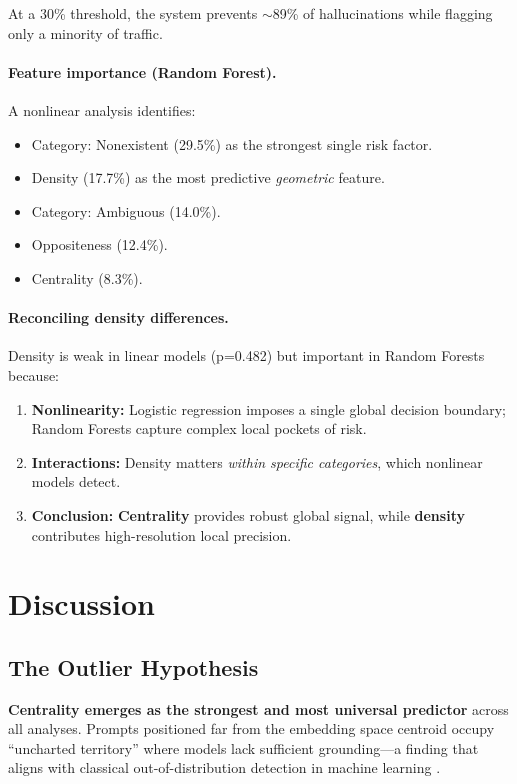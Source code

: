 \documentclass{article}
\begin{document}
At a 30\% threshold, the system prevents $\sim$89\% of hallucinations while flagging only a minority of traffic.

\paragraph{Feature importance (Random Forest).} A nonlinear analysis identifies:
\begin{itemize}
    \item Category: Nonexistent (29.5\%) as the strongest single risk factor.
    \item Density (17.7\%) as the most predictive \emph{geometric} feature.
    \item Category: Ambiguous (14.0\%).
    \item Oppositeness (12.4\%).
    \item Centrality (8.3\%).
\end{itemize}

\paragraph{Reconciling density differences.} Density is weak in linear models (p=0.482) but important in Random Forests because:
\begin{enumerate}
    \item \textbf{Nonlinearity:} Logistic regression imposes a single global decision boundary; Random Forests capture complex local pockets of risk.
    \item \textbf{Interactions:} Density matters \emph{within specific categories}, which nonlinear models detect.
    \item \textbf{Conclusion:} \textbf{Centrality} provides robust global signal, while \textbf{density} contributes high-resolution local precision.
\end{enumerate}

\section{Discussion}
\subsection{The Outlier Hypothesis}
\textbf{Centrality emerges as the strongest and most universal predictor} across all analyses. Prompts positioned far from the embedding space centroid occupy ``uncharted territory'' where models lack sufficient grounding---a finding that aligns with classical out-of-distribution detection in machine learning \citep{hendrycks2017baseline}.
\end{document}
